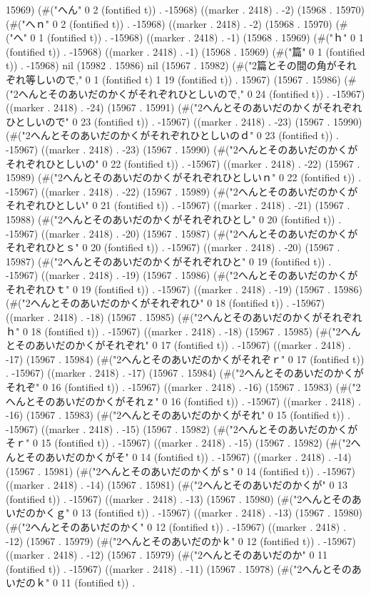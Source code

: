 15969) (#("へん" 0 2 (fontified t)) . -15968) ((marker . 2418) . -2) (15968 . 15970) (#("へｎ" 0 2 (fontified t)) . -15968) ((marker . 2418) . -2) (15968 . 15970) (#("へ" 0 1 (fontified t)) . -15968) ((marker . 2418) . -1) (15968 . 15969) (#("ｈ" 0 1 (fontified t)) . -15968) ((marker . 2418) . -1) (15968 . 15969) (#("篇" 0 1 (fontified t)) . -15968) nil (15982 . 15986) nil (15967 . 15982) (#("2篇とその間の角がそれぞれ等しいので," 0 1 (fontified t) 1 19 (fontified t)) . 15967) (15967 . 15986) (#("2へんとそのあいだのかくがそれぞれひとしいので," 0 24 (fontified t)) . -15967) ((marker . 2418) . -24) (15967 . 15991) (#("2へんとそのあいだのかくがそれぞれひとしいので" 0 23 (fontified t)) . -15967) ((marker . 2418) . -23) (15967 . 15990) (#("2へんとそのあいだのかくがそれぞれひとしいのｄ" 0 23 (fontified t)) . -15967) ((marker . 2418) . -23) (15967 . 15990) (#("2へんとそのあいだのかくがそれぞれひとしいの" 0 22 (fontified t)) . -15967) ((marker . 2418) . -22) (15967 . 15989) (#("2へんとそのあいだのかくがそれぞれひとしいｎ" 0 22 (fontified t)) . -15967) ((marker . 2418) . -22) (15967 . 15989) (#("2へんとそのあいだのかくがそれぞれひとしい" 0 21 (fontified t)) . -15967) ((marker . 2418) . -21) (15967 . 15988) (#("2へんとそのあいだのかくがそれぞれひとし" 0 20 (fontified t)) . -15967) ((marker . 2418) . -20) (15967 . 15987) (#("2へんとそのあいだのかくがそれぞれひとｓ" 0 20 (fontified t)) . -15967) ((marker . 2418) . -20) (15967 . 15987) (#("2へんとそのあいだのかくがそれぞれひと" 0 19 (fontified t)) . -15967) ((marker . 2418) . -19) (15967 . 15986) (#("2へんとそのあいだのかくがそれぞれひｔ" 0 19 (fontified t)) . -15967) ((marker . 2418) . -19) (15967 . 15986) (#("2へんとそのあいだのかくがそれぞれひ" 0 18 (fontified t)) . -15967) ((marker . 2418) . -18) (15967 . 15985) (#("2へんとそのあいだのかくがそれぞれｈ" 0 18 (fontified t)) . -15967) ((marker . 2418) . -18) (15967 . 15985) (#("2へんとそのあいだのかくがそれぞれ" 0 17 (fontified t)) . -15967) ((marker . 2418) . -17) (15967 . 15984) (#("2へんとそのあいだのかくがそれぞｒ" 0 17 (fontified t)) . -15967) ((marker . 2418) . -17) (15967 . 15984) (#("2へんとそのあいだのかくがそれぞ" 0 16 (fontified t)) . -15967) ((marker . 2418) . -16) (15967 . 15983) (#("2へんとそのあいだのかくがそれｚ" 0 16 (fontified t)) . -15967) ((marker . 2418) . -16) (15967 . 15983) (#("2へんとそのあいだのかくがそれ" 0 15 (fontified t)) . -15967) ((marker . 2418) . -15) (15967 . 15982) (#("2へんとそのあいだのかくがそｒ" 0 15 (fontified t)) . -15967) ((marker . 2418) . -15) (15967 . 15982) (#("2へんとそのあいだのかくがそ" 0 14 (fontified t)) . -15967) ((marker . 2418) . -14) (15967 . 15981) (#("2へんとそのあいだのかくがｓ" 0 14 (fontified t)) . -15967) ((marker . 2418) . -14) (15967 . 15981) (#("2へんとそのあいだのかくが" 0 13 (fontified t)) . -15967) ((marker . 2418) . -13) (15967 . 15980) (#("2へんとそのあいだのかくｇ" 0 13 (fontified t)) . -15967) ((marker . 2418) . -13) (15967 . 15980) (#("2へんとそのあいだのかく" 0 12 (fontified t)) . -15967) ((marker . 2418) . -12) (15967 . 15979) (#("2へんとそのあいだのかｋ" 0 12 (fontified t)) . -15967) ((marker . 2418) . -12) (15967 . 15979) (#("2へんとそのあいだのか" 0 11 (fontified t)) . -15967) ((marker . 2418) . -11) (15967 . 15978) (#("2へんとそのあいだのｋ" 0 11 (fontified t)) . 